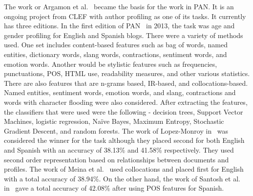 \documentclass[a4paper]{llncs}
\begin{document}
The work or Argamon et al.~\cite{argamon2009automatically} became the basis for the work in PAN. It is an ongoing project from CLEF with author profiling as one of its tasks. It currently has three editions. In the first edition of PAN~\cite{rangel2013overview} in 2013, the task  was age and gender profiling for English and Spanish blogs. There were a variety of methods used. One set includes content-based features such as bag of words, named entities, dictionary words, slang words, contractions, sentiment words, and emotion words. Another would be stylistic features such as frequencies, punctuations, POS, HTML use, readability measures, and other various statistics. There are also features that are n-grams based, IR-based, and collocations-based. Named entities, sentiment words, emotion words, and slang, contractions and words with character flooding were also considered. After extracting the features, the classifiers that were used were the following - decision trees, Support Vector Machines, logistic regression, Naïve Bayes, Maximum Entropy, Stochastic Gradient Descent, and random forests. The work of Lopez-Monroy in~\cite{lopez2013inaoe} was considered the winner for the task although they placed second for both English and Spanish with an accuracy of 38.13\% and 41.58\% respectively. They used second order representation based on relationships between documents and profiles. The work of Meina et al.~\cite{meina2013ensemble} used collocations and placed first for English with a total accuracy of 38.94\%. On the other hand, the work of Santosh et al. in~\cite{santosh2013author} gave a total accuracy of 42.08\% after using POS features for Spanish.
\end{document}
